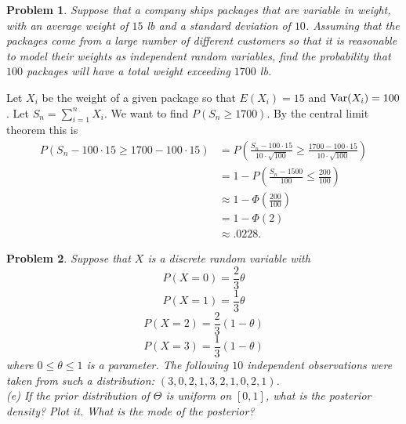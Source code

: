 \documentclass{article}
\newtheorem{problem}{Problem}
\newcommand{\var}{\textup{Var}}
\begin{document}
\begin{problem}
Suppose that a company ships packages that are variable in weight, with an average weight of $15$ lb and a standard deviation of $10$. Assuming that the packages come from a large number of different customers so that it is reasonable to model their weights as independent random variables, find the probability that $100$ packages will have a total weight exceeding $1700$ lb.
\end{problem}

Let $X_i$ be the weight of a given package so that $E(X_i) = 15$ and $\var(X_i) = 100$. Let $S_n = \sum_{i=1}^{n} X_i$. We want to find $P(S_n \geq 1700)$. By the central limit theorem this is
\begin{align*}
P(S_n - 100 \cdot 15 \geq 1700 - 100 \cdot 15)
&= P \left ( \frac{S_n - 100 \cdot 15}{10 \cdot \sqrt{100}} \geq \frac{1700 - 100 \cdot 15}{10 \cdot \sqrt{100}} \right )\\
&= 1 - P \left ( \frac{S_n - 1500}{100} \leq \frac{200}{100} \right )\\
&\approx 1 - \Phi \left ( \frac{200}{100} \right )\\
&= 1 - \Phi(2)\\
&\approx .0228.
\end{align*}

\begin{problem}
Suppose that $X$ is a discrete random variable with
\[
P(X = 0) = \frac{2}{3} \theta
\]
\[
P(X = 1) = \frac{1}{3} \theta
\]
\[
P(X = 2) = \frac{2}{3} (1 - \theta)
\]
\[
P(X = 3) = \frac{1}{3} (1 - \theta)
\]
where $0 \leq \theta \leq 1$ is a parameter. The following $10$ independent observations were taken from such a distribution: $(3, 0, 2, 1, 3, 2, 1, 0, 2, 1)$.\\
(e) If the prior distribution of $\Theta$ is uniform on $[0,1]$, what is the posterior density? Plot it. What is the mode of the posterior?
\end{problem}
\end{document}

